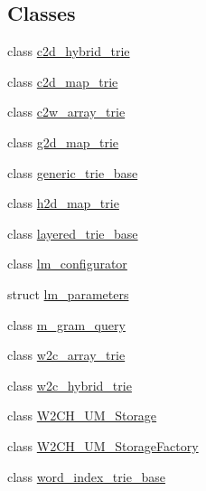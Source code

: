\subsection*{Classes}
\begin{DoxyCompactItemize}
\item 
class \hyperlink{classuva_1_1smt_1_1bpbd_1_1server_1_1lm_1_1c2d__hybrid__trie}{c2d\+\_\+hybrid\+\_\+trie}
\item 
class \hyperlink{classuva_1_1smt_1_1bpbd_1_1server_1_1lm_1_1c2d__map__trie}{c2d\+\_\+map\+\_\+trie}
\item 
class \hyperlink{classuva_1_1smt_1_1bpbd_1_1server_1_1lm_1_1c2w__array__trie}{c2w\+\_\+array\+\_\+trie}
\item 
class \hyperlink{classuva_1_1smt_1_1bpbd_1_1server_1_1lm_1_1g2d__map__trie}{g2d\+\_\+map\+\_\+trie}
\item 
class \hyperlink{classuva_1_1smt_1_1bpbd_1_1server_1_1lm_1_1generic__trie__base}{generic\+\_\+trie\+\_\+base}
\item 
class \hyperlink{classuva_1_1smt_1_1bpbd_1_1server_1_1lm_1_1h2d__map__trie}{h2d\+\_\+map\+\_\+trie}
\item 
class \hyperlink{classuva_1_1smt_1_1bpbd_1_1server_1_1lm_1_1layered__trie__base}{layered\+\_\+trie\+\_\+base}
\item 
class \hyperlink{classuva_1_1smt_1_1bpbd_1_1server_1_1lm_1_1lm__configurator}{lm\+\_\+configurator}
\item 
struct \hyperlink{structuva_1_1smt_1_1bpbd_1_1server_1_1lm_1_1lm__parameters}{lm\+\_\+parameters}
\item 
class \hyperlink{classuva_1_1smt_1_1bpbd_1_1server_1_1lm_1_1m__gram__query}{m\+\_\+gram\+\_\+query}
\item 
class \hyperlink{classuva_1_1smt_1_1bpbd_1_1server_1_1lm_1_1w2c__array__trie}{w2c\+\_\+array\+\_\+trie}
\item 
class \hyperlink{classuva_1_1smt_1_1bpbd_1_1server_1_1lm_1_1w2c__hybrid__trie}{w2c\+\_\+hybrid\+\_\+trie}
\item 
class \hyperlink{classuva_1_1smt_1_1bpbd_1_1server_1_1lm_1_1_w2_c_h___u_m___storage}{W2\+C\+H\+\_\+\+U\+M\+\_\+\+Storage}
\item 
class \hyperlink{classuva_1_1smt_1_1bpbd_1_1server_1_1lm_1_1_w2_c_h___u_m___storage_factory}{W2\+C\+H\+\_\+\+U\+M\+\_\+\+Storage\+Factory}
\item 
class \hyperlink{classuva_1_1smt_1_1bpbd_1_1server_1_1lm_1_1word__index__trie__base}{word\+\_\+index\+\_\+trie\+\_\+base}
\end{DoxyCompactItemize}
